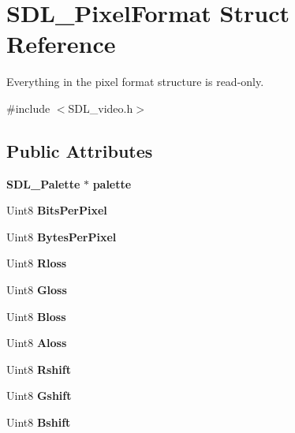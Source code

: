 \section{S\+D\+L\+\_\+\+Pixel\+Format Struct Reference}
\label{struct_s_d_l___pixel_format}


Everything in the pixel format structure is read-\/only.  




{\ttfamily \#include $<$S\+D\+L\+\_\+video.\+h$>$}

\subsection*{Public Attributes}
\begin{DoxyCompactItemize}
\item 
{\bf S\+D\+L\+\_\+\+Palette} $\ast$ {\bfseries palette}\label{struct_s_d_l___pixel_format_aeae611aba76f5eb11b696807926c5116}

\item 
Uint8 {\bfseries Bits\+Per\+Pixel}\label{struct_s_d_l___pixel_format_aac533fae3043ef44df01108248e111d8}

\item 
Uint8 {\bfseries Bytes\+Per\+Pixel}\label{struct_s_d_l___pixel_format_a6fec9e1809cc3da458d58b8cccd058f2}

\item 
Uint8 {\bfseries Rloss}\label{struct_s_d_l___pixel_format_a9994b4ed87a2551253aebfa191db8424}

\item 
Uint8 {\bfseries Gloss}\label{struct_s_d_l___pixel_format_a94469768d8436e631a13d68623ff663f}

\item 
Uint8 {\bfseries Bloss}\label{struct_s_d_l___pixel_format_a337072c1bc8b41efdd2da4e95b8c2ff7}

\item 
Uint8 {\bfseries Aloss}\label{struct_s_d_l___pixel_format_a660e95097874088292f1289a458efaa2}

\item 
Uint8 {\bfseries Rshift}\label{struct_s_d_l___pixel_format_abfdec7b9ee2ee39db630f4022e4e0daa}

\item 
Uint8 {\bfseries Gshift}\label{struct_s_d_l___pixel_format_a6045012f994c02a86bdc4a91b28d2a3c}

\item 
Uint8 {\bfseries Bshift}\label{struct_s_d_l___pixel_format_a4212574b67529628d8822ed4eb109754}


\end{DoxyCompactItemize}
